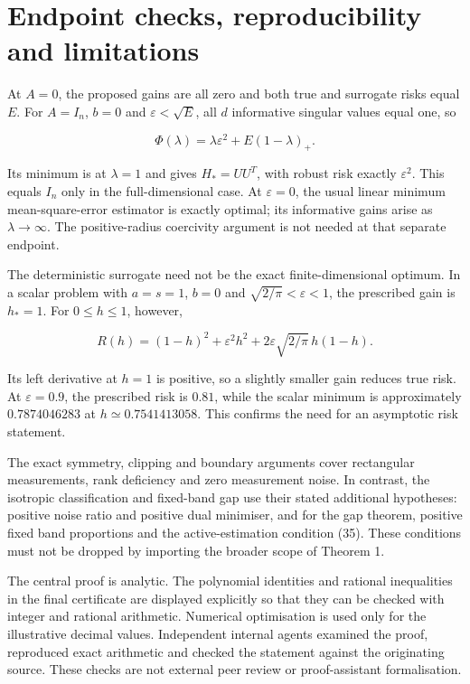 \documentclass[11pt,a4paper]{article}
\begin{document}
\hypertarget{endpoint-checks-reproducibility-and-limitations}{%
\section{Endpoint checks, reproducibility and
limitations}\label{endpoint-checks-reproducibility-and-limitations}}

At \(A=0\), the proposed gains are all zero and both true and surrogate
risks equal \(E\). For \(A=I_n\), \(b=0\) and \(\varepsilon<\sqrt E\),
all \(d\) informative singular values equal one, so

\[
\Phi(\lambda)=\lambda\varepsilon^2+E(1-\lambda)_+.
\]

Its minimum is at \(\lambda=1\) and gives \(H_*=UU^T\), with robust risk
exactly \(\varepsilon^2\). This equals \(I_n\) only in the
full-dimensional case. At \(\varepsilon=0\), the usual linear minimum
mean-square-error estimator is exactly optimal; its informative gains
arise as \(\lambda\to\infty\). The positive-radius coercivity argument
is not needed at that separate endpoint.

The deterministic surrogate need not be the exact finite-dimensional
optimum. In a scalar problem with \(a=s=1\), \(b=0\) and
\(\sqrt{2/\pi}<\varepsilon<1\), the prescribed gain is \(h_*=1\). For
\(0\le h\le1\), however,

\[
R(h)=(1-h)^2+\varepsilon^2h^2
+2\varepsilon\sqrt{2/\pi}\,h(1-h).
\tag{54}
\]

Its left derivative at \(h=1\) is positive, so a slightly smaller gain
reduces true risk. At \(\varepsilon=0.9\), the prescribed risk is
\(0.81\), while the scalar minimum is approximately \(0.7874046283\) at
\(h\simeq0.7541413058\). This confirms the need for an asymptotic risk
statement.

The exact symmetry, clipping and boundary arguments cover rectangular
measurements, rank deficiency and zero measurement noise. In contrast,
the isotropic classification and fixed-band gap use their stated
additional hypotheses: positive noise ratio and positive dual minimiser,
and for the gap theorem, positive fixed band proportions and the
active-estimation condition (35). These conditions must not be dropped
by importing the broader scope of Theorem 1.

The central proof is analytic. The polynomial identities and rational
inequalities in the final certificate are displayed explicitly so that
they can be checked with integer and rational arithmetic. Numerical
optimisation is used only for the illustrative decimal values.
Independent internal agents examined the proof, reproduced exact
arithmetic and checked the statement against the originating source.
These checks are not external peer review or proof-assistant
formalisation.
\end{document}
